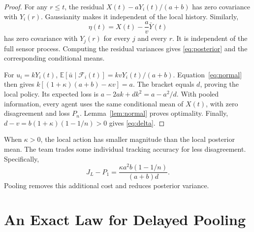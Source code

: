 \documentclass[letterpaper,10pt,conference]{ieeeconf}
\newcommand{\E}{\mathbb E}
\begin{document}
\begin{proof}
For any $r\le t$, the residual $X(t)-aY_i(t)/(a+b)$ has zero covariance with $Y_i(r)$. Gaussianity makes it independent of the local history. Similarly,
\begin{equation}
 \eta(t)=X(t)-\frac av\bar Y(t)\label{eq:eta}
\end{equation}
has zero covariance with $Y_j(r)$ for every $j$ and every $r$. It is independent of the full sensor process. Computing the residual variances gives \eqref{eq:posterior} and the corresponding conditional means.

For $u_i=kY_i(t)$,
$\E[\bar u\mid\mathcal F_i(t)]=kvY_i(t)/(a+b)$.
Equation~\eqref{eq:normal} then gives
$k[(1+\kappa)(a+b)-\kappa v]=a$.
The bracket equals $d$, proving the local policy. Its expected loss is $a-2ak+dk^2=a-a^2/d$. With pooled information, every agent uses the same conditional mean of $X(t)$, with zero disagreement and loss $P_n$. Lemma~\ref{lem:normal} proves optimality. Finally, $d-v=b(1+\kappa)(1-1/n)>0$ gives \eqref{eq:delta}.
\end{proof}
When $\kappa>0$, the local action has smaller magnitude than the local posterior mean. The team trades some individual tracking accuracy for less disagreement. Specifically,
\begin{equation}
 J_L-P_1=\frac{\kappa a^2b(1-1/n)}{(a+b)d}.\label{eq:localgap}
\end{equation}
Pooling removes this additional cost and reduces posterior variance.

\section{An Exact Law for Delayed Pooling}
\end{document}

